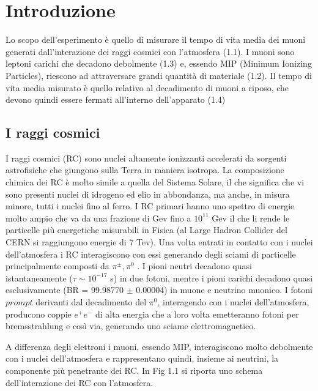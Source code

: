 \documentclass{standalone}
\begin{document}
	\pagestyle{fancy}
	\lhead{\rightmark}
	\rhead{\thepage}

\chapter{Introduzione}
Lo scopo dell'esperimento \`e quello di misurare il tempo di vita media dei muoni generati dall'interazione dei raggi cosmici con l'atmosfera (1.1). I muoni sono leptoni carichi che decadono debolmente (1.3) e, essendo MIP (Minimum Ionizing Particles), riescono ad attraversare grandi quantit\`a di materiale (1.2). Il tempo di vita media misurato \`e quello relativo al decadimento di muoni a riposo, che devono quindi essere fermati all'interno dell'apparato (1.4)

\section{I raggi cosmici}
I raggi cosmici (RC) sono nuclei altamente ionizzanti accelerati da sorgenti astrofisiche che giungono sulla Terra in maniera isotropa. La composizione chimica dei RC \`e molto simile a quella del Sistema Solare, il che significa che vi sono presenti nuclei di idrogeno ed elio in abbondanza, ma anche, in misura minore,  tutti i nuclei fino al ferro.
I RC primari hanno uno spettro di energie molto ampio che va da una frazione di Gev fino a $10^{11}$ Gev il che li rende le particelle pi\`u energetiche misurabili in Fisica (al Large Hadron Collider del CERN si raggiungono energie di 7 Tev).
Una volta entrati in contatto con i nuclei dell'atmosfera i RC interagiscono con essi generando degli sciami di particelle principalmente composti da $\pi^\pm, \pi^0$ \cite{Spurio}.
I pioni neutri decadono quasi istantaneamente ($\tau \sim 10^{-17}$ s) in due fotoni, mentre i pioni carichi decadono quasi esclusivamente (BR = 99.98770 $\pm$ 0.00004) in muone e neutrino muonico.
I fotoni $prompt$ derivanti dal decadimento del $\pi^0$, interagendo con i nuclei dell'atmosfera, producono coppie $e^+e^-$ di alta energia che a loro volta emetteranno fotoni per bremsstrahlung e cos\`i via, generando uno sciame elettromagnetico.

A differenza degli elettroni i muoni, essendo MIP, interagiscono molto debolmente con i nuclei dell'atmosfera e rappresentano quindi, insieme ai neutrini, la componente pi\`u penetrante dei RC. In Fig 1.1 si riporta uno schema dell'interazione dei RC con l'atmosfera.
\end{document}
